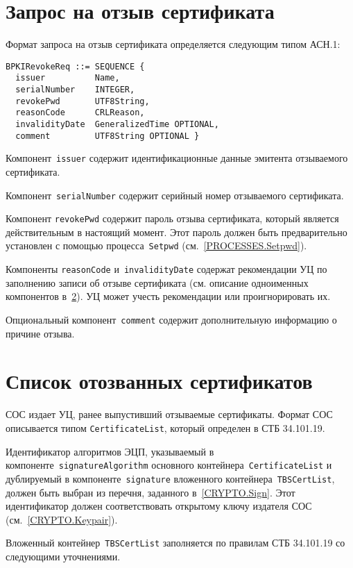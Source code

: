 \section{Запрос на отзыв сертификата}\label{FMT.BPKIRevokeReq}

Формат запроса на отзыв сертификата определяется следующим типом АСН.1:
\begin{verbatim}
BPKIRevokeReq ::= SEQUENCE {
  issuer          Name,
  serialNumber    INTEGER,
  revokePwd       UTF8String,
  reasonCode      CRLReason,      
  invalidityDate  GeneralizedTime OPTIONAL,
  comment         UTF8String OPTIONAL }
\end{verbatim}

Компонент~\texttt{issuer} содержит идентификационные данные эмитента 
отзываемого сертификата.

Компонент~\texttt{serialNumber} содержит серийный номер отзываемого 
сертификата.

Компонент \texttt{revokePwd} содержит пароль отзыва
сертификата, который является действительным в 
настоящий момент. Этот пароль должен быть предварительно
установлен с помощью процесса~\texttt{Setpwd} (см.~\ref{PROCESSES.Setpwd}). 

Компоненты \texttt{reasonCode} и~\texttt{invalidityDate}
содержат рекомендации УЦ по заполнению записи об отзыве сертификата
(см. описание одноименных компонентов в~\ref{FMT.CRL}).
УЦ может учесть рекомендации или проигнорировать их.

Опциональный компонент~\texttt{comment} содержит дополнительную информацию 
о причине отзыва.
 
\section{Список отозванных сертификатов}\label{FMT.CRL}

СОС издает УЦ, ранее выпустивший отзываемые сертификаты.
Формат СОС описывается типом \texttt{CertificateList}, который определен в 
СТБ 34.101.19. 

Идентификатор алгоритмов ЭЦП, указываемый в
компоненте~\texttt{signatureAlgorithm} основного
контейнера~\texttt{CertificateList} и дублируемый в
компоненте~\texttt{signature} вложенного контейнера~\texttt{TBSCertList},
должен быть выбран из перечня, заданного в~\ref{CRYPTO.Sign}. Этот
идентификатор должен соответствовать открытому ключу издателя СОС
(см.~\ref{CRYPTO.Keypair}).

Вложенный контейнер~\texttt{TBSCertList} заполняется по правилам СТБ 
34.101.19 со следующими уточнениями.

